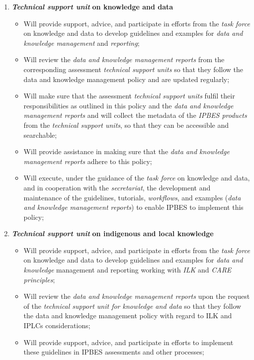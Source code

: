 \documentclass{article}
\begin{document}
\begin{enumerate}[label=(\alph*)]
    \item \textit{\textbf{Technical support unit}}\textbf{ on knowledge and data}
    \begin{itemize}
        \item Will provide support, advice, and participate in efforts from the \textit{task force }on knowledge and data to develop guidelines and examples for \textit{data and knowledge management} and \textit{reporting};
        \item Will review the\textit{ data and knowledge management reports} from the corresponding assessment \textit{technical support units }so that they follow the data and knowledge management policy and are updated regularly;
        \item Will make sure that the assessment \textit{technical support units} fulfil their responsibilities as outlined in this policy and the \textit{data and knowledge management reports} and will collect the metadata of the \textit{IPBES products }from the \textit{technical support units}, so that they can be accessible and searchable;
        \item Will provide assistance in making sure that the \textit{data and knowledge management reports} adhere to this policy;
        \item Will execute, under the guidance of the \textit{task force }on knowledge and data, and in cooperation with the \textit{secretariat}, the development and maintenance of the guidelines, tutorials, \textit{workflows}, and examples (\textit{data and knowledge management reports}) to enable IPBES to implement this policy;
    \end{itemize}

    \item \textit{\textbf{Technical support unit}}\textbf{ on indigenous and local knowledge}
    \begin{itemize}
        \item Will provide support, advice, and participate in efforts from the \textit{task force} on knowledge and data to develop guidelines and examples for \textit{data and knowledge} management and reporting working with\textit{ ILK} and \textit{CARE principles};
        \item Will review the \textit{data and knowledge management reports} upon the request of the \textit{technical support unit for knowledge and data} so that they follow the data and knowledge management policy with regard to ILK and IPLCs considerations;
        \item Will provide support, advice, and participate in efforts to implement these guidelines in IPBES assessments and other processes;
    \end{itemize}


\end{enumerate}
\end{document}
